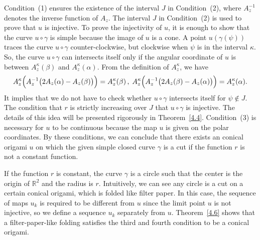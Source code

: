 \documentclass{amsart}
\theoremstyle{plain}
\theoremstyle{definition}
\theoremstyle{remark}
\begin{document}
Condition~(1) ensures the existence of the interval $J$ in Condition~(2), where $A_z^{-1}$ denotes the inverse function of $A_z$.
The interval $J$ in Condition~(2) is used to prove that $u$ is injective.
To prove the injectivity of $u$, it is enough to show that the curve $u\circ\gamma$ is simple because the image of $u$ is a cone.
A point $u(\gamma(\psi))$ traces the curve $u\circ\gamma$ counter-clockwise, but clockwise when $\psi$ is in the interval $\kappa$.
So, the curve $u\circ\gamma$ can intersects itself only if the angular coordinate of $u$ is between $A_z^{\kappa}(\beta)$ and $A_z^{\kappa}(\alpha)$.
From the definition of $A_z^{\kappa}$, we have
\begin{align*}
A_z^{\kappa}\Bigl(A_z^{-1}\bigl(2A_z(\alpha)-A_z(\beta)\bigr)\Bigr)=A_z^{\kappa}(\beta)\,,\; A_z^{\kappa}\Bigl(A_z^{-1}\bigl(2A_z(\beta)-A_z(\alpha)\bigr)\Bigr)=A_z^{\kappa}(\alpha).
\end{align*}
It implies that we do not have to check whether $u\circ\gamma$ intersects itself for $\psi\notin J$.
The condition that $r$ is strictly increasing over $J$ that $u\circ\gamma$ is injective.
The details of this idea will be presented rigorously in Theorem~\ref{4.4}.
Condition~(3) is necessary for $u$ to be continuous because the map $u$ is given on the polar coordinates.
By these conditions, we can conclude that there exists an conical origami $u$ on which the given simple closed curve $\gamma$ is a cut if the function $r$ is not a constant function.

If the function $r$ is constant, the curve $\gamma$ is a circle such that the center is the origin of $\mathbb{R}^2$ and the radius is $r$.
Intuitively, we can see any circle is a cut on a certain conical origami, which is folded like filter paper.
In this case, the sequence of maps $u_k$ is required to be different from $u$ since the limit point $u$ is not injective, so we define a sequence $u_k$ separately from $u$.
Theorem~\ref{4.6} shows that a filter-paper-like folding satisfies the third and fourth condition to be a conical origami.
\end{document}
